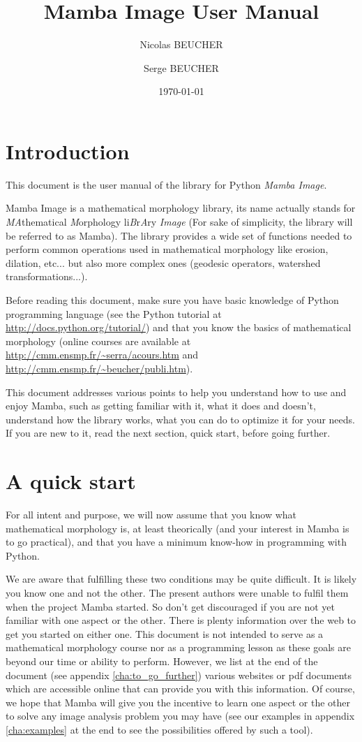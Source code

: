 \documentclass[a4paper,10pt,oneside]{article}
\title{Mamba Image User Manual}
\author{Nicolas BEUCHER \and Serge BEUCHER}
\date{\today}
\begin{document}
\mambaCover
\mambaContent

\section{Introduction}

This document is the user manual of the library for Python \emph{Mamba Image}.

Mamba Image is a mathematical morphology library, its name actually stands for 
\emph{MA}thematical \emph{M}orphology li\emph{B}r\emph{A}ry \emph{Image} 
(For sake of simplicity, the library will be referred to as Mamba). The library 
provides a wide set of functions needed to perform common operations used in 
mathematical morphology like erosion, dilation, etc... but also more complex ones
(geodesic operators, watershed transformations...).

Before reading this document, make sure you have basic knowledge of Python
programming language (see the Python tutorial at 
\url{http://docs.python.org/tutorial/}) and that you know the basics of 
mathematical morphology (online courses are available at 
\url{http://cmm.ensmp.fr/~serra/acours.htm} and \url{http://cmm.ensmp.fr/~beucher/publi.htm}).

This document addresses various points to help you understand how to use and
enjoy Mamba, such as getting familiar with it, what it does and doesn't,
understand how the library works, what you can do to optimize it for your
needs. If you are new to it, read the next section, quick start, before going
further.

\pagebreak

\section{A quick start}

For all intent and purpose, we will now assume that you know what mathematical
morphology is, at least theorically (and your interest in Mamba is to go 
practical), and that you have a minimum know-how in programming with Python.

We are aware that fulfilling these two conditions may be quite difficult. It is 
likely you know one and not the other. The present authors were unable to 
fulfil them when the project Mamba started. So don't get discouraged if you are
not yet familiar with one aspect or the other. There is plenty information over
the web to get you started on either one. This document is not intended to serve
as a mathematical morphology course nor as a programming lesson as these goals are
beyond our time or ability to perform. However, we list at the end of the
document (see appendix \ref{cha:to_go_further}) various websites or pdf documents which are 
accessible online that can provide you with this information. Of course, we hope that
Mamba will give you the incentive to learn one aspect or the other to solve
any image analysis problem you may have (see our examples in appendix 
\ref{cha:examples} at the end to see the possibilities offered by such a tool).
\end{document}
